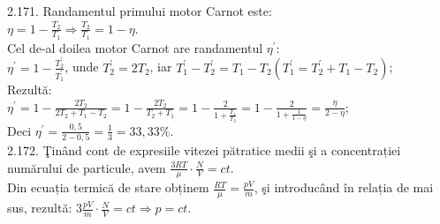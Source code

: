 2.171. Randamentul primului motor Carnot este:\\ $\eta=1-\frac{T_{2}}{T_{1}} \Rightarrow \frac{T_{2}}{T_{1}}=1-\eta$.\\ Cel de-al doilea motor Carnot are randamentul $\eta^{\prime}$:\\ $\eta^{\prime}=1-\frac{T_{2}^{\prime}}{T_{1}^{\prime}}$, unde $T_{2}^{\prime}=2 T_{2}$, iar $T_{1}^{\prime}-T_{2}^{\prime}=T_{1}-T_{2}\left(T_{1}^{\prime}=T_{2}^{\prime}+T_{1}-T_{2}\right)$;\\ Rezultă:\\ $\eta^{\prime}=1-\frac{2 T_{2}}{2 T_{2}+T_{1}-T_{2}}=1-\frac{2 T_{2}}{T_{2}+T_{1}}=1-\frac{2}{1+\frac{T_{1}}{T_{2}}}=1-\frac{2}{1+\frac{1}{1-\eta}}=\frac{\eta}{2-\eta}$;\\ Deci $\eta^{\prime}=\frac{0,5}{2-0,5}=\frac{1}{3}=33,33 \%$.\\

2.172. Ţinând cont de expresiile vitezei pătratice medii şi a concentrației numărului de particule, avem $\frac{3 R T}{\mu} \cdot \frac{N}{V}=c t$.\\ Din ecuația termică de stare obținem $\frac{R T}{\mu}=\frac{p V}{m}$, şi introducând în relația de mai sus, rezultă: $3 \frac{p V}{m} \cdot \frac{N}{V}=c t \Rightarrow p=c t$.\\

